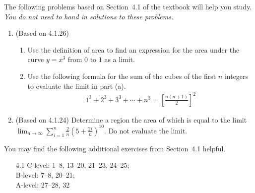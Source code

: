 \documentclass{article}
\title{\commonPSTitleZeroFourOne}
\author{\commonAuthor}
\date{\commonDateZeroFourOne}
\newcommand{\ds}{\displaystyle}
\begin{document}
\maketitle
\thispagestyle{empty}

\noindent
The following problems based on Section~4.1 of the textbook will help
you study.  \emph{You do not need to hand in solutions to these
  problems.}
\begin{enumerate}
\item (Based on 4.1.26)
  \begin{enumerate}
  \item Use the definition of area to find an expression for the area under
    the curve $y=x^3$ from $0$ to $1$ as a limit.
  \item Use the following formula for the sum of the cubes of the first
    $n$ integers to evaluate the limit in part (a).
    \begin{align*}
      1^3 + 2^3 + 3^3 + \cdots + n^3 = \left[ \frac{n(n+1)}{2} \right]^2
    \end{align*}
  \end{enumerate}
\item (Based on 4.1.24)
  Determine a region the area of which is equal to the limit
  $\ds\lim_{n\to\infty} \sum_{i=1}^n \frac{2}{n} 
  \left(5+\frac{2i}{n}\right)^{10}$.  Do not evaluate the limit.
\end{enumerate}

\noindent
You may find the following additional exercises from Section~4.1
helpful.
\begin{itemize}
\item[4.1]
  C-level: 1--8, 13--20, 21--23, 24--25; \\
  B-level: 7--8, 20--21; \\
  A-level: 27--28, 32
\end{itemize}
\end{document}
